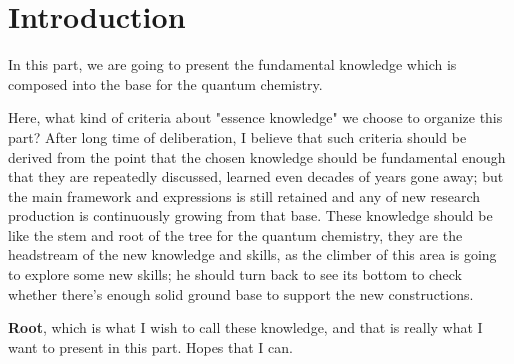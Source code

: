 \chapter{Introduction}
In this part, we are going to present the fundamental knowledge
which is composed into the base for the quantum chemistry.

Here, what kind of criteria about "essence knowledge" we choose to
organize this part? After long time of deliberation, I believe that
such criteria should be derived from the point that the chosen
knowledge should be fundamental enough that they are repeatedly
discussed, learned even decades of years gone away; but the main
framework and expressions is still retained and any of new research
production is continuously growing from that base. These knowledge
should be like the stem and root of the tree for the quantum
chemistry, they are the headstream of the new knowledge and skills,
as the climber of this area is going to explore some new skills; he
should turn back to see its bottom to check whether there's enough
solid ground base to support the new constructions.

\textbf{Root}, which is what I wish to call these knowledge, and
that is really what I want to present in this part. Hopes that I
can.





